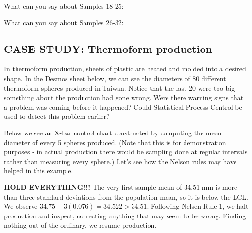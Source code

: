 \documentclass{ximera}
\begin{document}
\begin{problem}
What can you say about Samples  18-25:
\begin{multipleChoice}
\end{multipleChoice}

What can you say about Samples  26-32:
\begin{multipleChoice}
\end{multipleChoice}
\end{problem}

\subsection*{CASE STUDY: Thermoform production}

In thermoform production, sheets of plastic are heated and molded into a desired shape.  In the Desmos sheet below, we can see the diameters of 80 different thermoform spheres produced in Taiwan.  Notice that the last 20 were too big - something about the production had gone wrong.  Were there warning signs that a problem was coming before it happened?  Could Statistical Process Control be used to detect this problem earlier?


Below we see an X-bar control chart constructed by computing the mean diameter of every 5 spheres produced.  (Note that this is for demonstration purposes - in actual production there would be sampling done at regular intervals rather than measuring every sphere.)  Let's see how the Nelson rules may have helped in this example.


\textbf{HOLD EVERYTHING!!!}  The very first sample mean of 34.51 mm is more than three standard deviations from the population mean, so it is below the LCL.  We observe $34.75 - 3(0.076)=34.522>34.51$.  Following Nelsen Rule 1, we halt production and inspect, correcting anything that may seem to be wrong.  Finding nothing out of the ordinary, we resume production.
\end{document}
